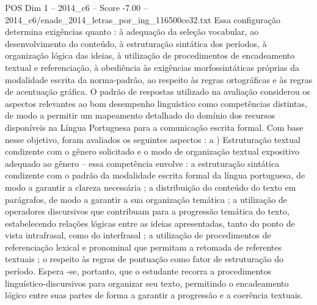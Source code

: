 \begin{textsample}{POS Dim 1 – 2014\_c6 – Score -7.00 – 2014\_c6/enade\_2014\_letras\_por\_ing\_116500ce32.txt}
Essa configuração determina exigências quanto : à adequação da seleção vocabular, ao desenvolvimento do conteúdo, à estruturação sintática dos períodos, à organização lógica das ideias, à utilização de procedimentos de encadeamento textual e referenciação, à obediência às exigências morfossintáticas próprias da modalidade escrita da norma-padrão, ao respeito às regras ortográficas e às regras de acentuação gráfica.
O padrão de respostas utilizado na avaliação considerou os aspectos relevantes ao bom desempenho linguístico como competências distintas, de modo a permitir um mapeamento detalhado do domínio dos recursos disponíveis na Língua Portuguesa para a comunicação escrita formal.
Com base nesse objetivo, foram avaliados os seguintes aspectos : a ) Estruturação textual condizente com o gênero solicitado e o modo de organização textual expositivo adequado ao gênero – essa competência envolve : a estruturação sintática condizente com o padrão da modalidade escrita formal da língua portuguesa, de modo a garantir a clareza necessária ; a distribuição do conteúdo do texto em parágrafos, de modo a garantir a sua organização temática ; a utilização de operadores discursivos que contribuam para a progressão temática do texto, estabelecendo relações lógicas entre as ideias apresentadas, tanto do ponto de vista intrafrasal, como do interfrasal ; a utilização de procedimentos de referenciação lexical e pronominal que permitam a retomada de referentes textuais ; o respeito às regras de pontuação como fator de estruturação do período.
Espera -se, portanto, que o estudante recorra a procedimentos linguístico-discursivos para organizar seu texto, permitindo o encadeamento lógico entre suas partes de forma a garantir a progressão e a coerência textuais.

\end{textsample}
